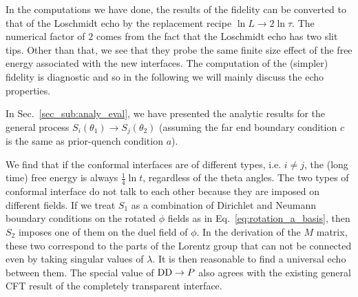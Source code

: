 

In the computations we have done, the results of the fidelity can be converted to that of the Loschmidt echo by the replacement recipe $ \ln L \rightarrow 2 \ln \tau$. The numerical factor of $2$ comes from the fact that the Loschmidt echo has two slit tips. Other than that, we see that they probe the same finite size effect of the free energy associated with the new interfaces. The computation of the (simpler) fidelity is diagnostic and so in the following we will mainly discuss the echo properties. 

In Sec.~\ref{sec_sub:analy_eval}, we have presented the analytic results for the general process $S_i( \theta_1 ) \rightarrow S_j( \theta_2 )$ {\iffalse {\color{red}described in Eq.~\eqref{eq:S_i_S_j}}\fi} (assuming the far end boundary condition $c$ is the same as prior-quench condition $a$). 

We find that if the conformal interfaces are of different types, i.e. $i \ne j$, the (long time) free energy is always $\frac{1}{4} \ln t$, regardless of the theta angles. The two types of conformal interface do not talk to each other because they are imposed on different fields. If we treat $S_1$ as a combination of Dirichlet and Neumann boundary conditions on the rotated $\phi$ fields as in Eq.~\eqref{eq:rotation_a_basis}, then $S_2$ imposes one of them on the duel field of $\phi$. In the derivation of the $M$ matrix, these two correspond to the parts of the Lorentz group that can not be connected even by taking singular values of $\lambda$. It is then reasonable to find a universal echo between them. The special value of ${\rm DD} \rightarrow P$ also agrees with the existing general CFT result of the completely transparent interface\cite{stephan_logarithmic_2013,stephan_local_2011,vasseur_universal_2014,vasseur_crossover_2013,kennes_universal_2014}. 


